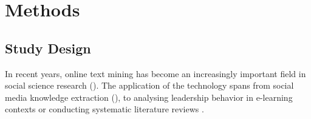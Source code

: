 








\section{Methods}
\subsection{Study Design}
In recent years, online text mining has become an increasingly important field in social science research (\cites[37]{Ignatow2018}{Shumate2016}). The application of the technology spans from social media knowledge extraction (\cite{A.Salloumetal.2017}), to analysing leadership behavior in e-learning contexts \parencite{Xie2018} or conducting systematic literature reviews \parencite{Mergel2018}. 

